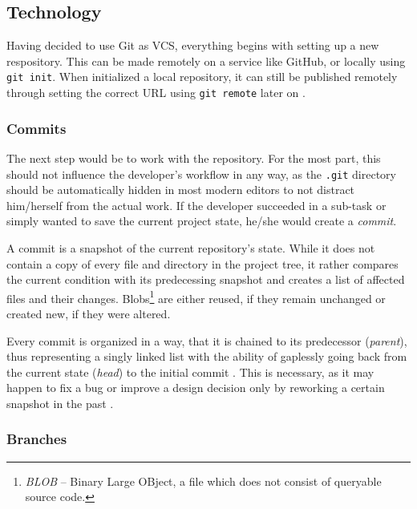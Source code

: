 
\subsection{Technology}
\label{sec:git-technology}
Having decided to use Git as VCS, everything begins with setting up a new respository. This can be made remotely on a service like GitHub, or locally using \texttt{git init}. When initialized a local repository, it can still be published remotely through setting the correct URL using \texttt{git remote} later on \cite[198]{loeliger2012version}.

\subsubsection{Commits}
The next step would be to work with the repository. For the most part, this should not influence the developer's workflow in any way, as the \texttt{.git} directory should be automatically hidden in most modern editors to not distract him/herself from the actual work. If the developer succeeded in a sub-task or simply wanted to save the current project state, he/she would create a \emph{commit}.

A commit is a snapshot of the current repository's state. While it does not contain a copy of every file and directory in the project tree, it rather compares the current condition with its predecessing snapshot and creates a list of affected files and their changes. Blobs\footnote{\emph{BLOB} -- Binary Large OBject, a file which does not consist of queryable source code.} are either reused, if they remain unchanged or created new, if they were altered\cite[65]{loeliger2012version}.

Every commit is organized in a way, that it is chained to its predecessor (\emph{parent}), thus representing a singly linked list with the ability of gaplessly going back from the current state (\emph{head}) to the initial commit \cite[204]{dhillon2016}\cite[65]{loeliger2012version}. This is necessary, as it may happen to fix a bug or improve a design decision only by reworking a certain snapshot in the past \cite[151]{loeliger2012version}.

\subsubsection{Branches}

